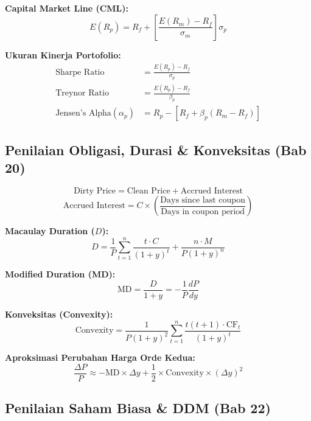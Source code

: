 \documentclass[10pt,a4paper]{article}
\begin{document}
\textbf{Capital Market Line (CML):}
\begin{equation}
E(R_p) = R_f + \left[\frac{E(R_m) - R_f}{\sigma_m}\right] \sigma_p
\end{equation}

\textbf{Ukuran Kinerja Portofolio:}
\begin{align}
\text{Sharpe Ratio} &= \frac{E(R_p) - R_f}{\sigma_p} \\
\text{Treynor Ratio} &= \frac{E(R_p) - R_f}{\beta_p} \\
\text{Jensen's Alpha} (\alpha_p) &= R_p - \left[R_f + \beta_p (R_m - R_f)\right]
\end{align}

\subsection{Penilaian Obligasi, Durasi \& Konveksitas (Bab 20)}

\begin{equation}
\text{Dirty Price} = \text{Clean Price} + \text{Accrued Interest}
\end{equation}
\begin{equation}
\text{Accrued Interest} = C \times \left(\frac{\text{Days since last coupon}}{\text{Days in coupon period}}\right)
\end{equation}

\textbf{Macaulay Duration ($D$):}
\begin{equation}
D = \frac{1}{P} \sum_{t=1}^n \frac{t \cdot C}{(1 + y)^t} + \frac{n \cdot M}{P (1 + y)^n}
\end{equation}

\textbf{Modified Duration (MD):}
\begin{equation}
\text{MD} = \frac{D}{1 + y} = -\frac{1}{P} \frac{dP}{dy}
\end{equation}

\textbf{Konveksitas (Convexity):}
\begin{equation}
\text{Convexity} = \frac{1}{P (1 + y)^2} \sum_{t=1}^n \frac{t(t + 1) \cdot \text{CF}_t}{(1 + y)^t}
\end{equation}

\textbf{Aproksimasi Perubahan Harga Orde Kedua:}
\begin{equation}
\frac{\Delta P}{P} \approx -\text{MD} \times \Delta y + \frac{1}{2} \times \text{Convexity} \times (\Delta y)^2
\end{equation}

\subsection{Penilaian Saham Biasa \& DDM (Bab 22)}
\end{document}

